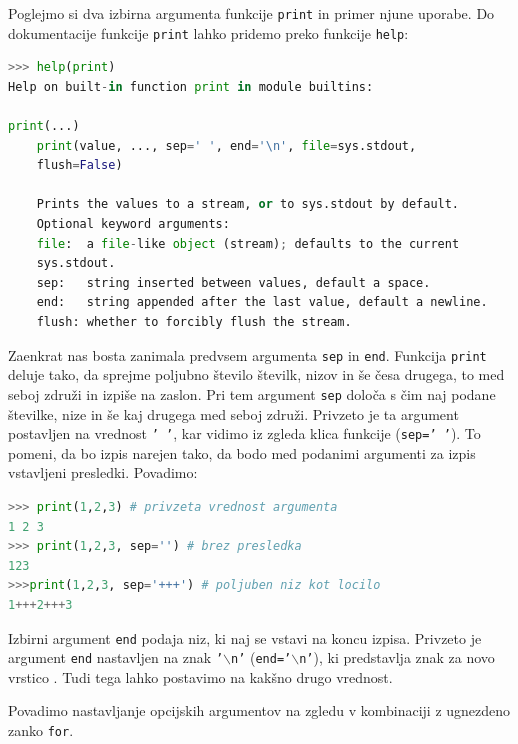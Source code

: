 Poglejmo si dva izbirna argumenta funkcije \texttt{print} in primer njune uporabe. Do dokumentacije funkcije \texttt{print} lahko pridemo preko funkcije \texttt{help}:
\begin{lstlisting}[language=Python, showstringspaces=false]
>>> help(print)
Help on built-in function print in module builtins:

print(...)
    print(value, ..., sep=' ', end='\n', file=sys.stdout, 
    flush=False)
    
    Prints the values to a stream, or to sys.stdout by default.
    Optional keyword arguments:
    file:  a file-like object (stream); defaults to the current 
    sys.stdout.
    sep:   string inserted between values, default a space.
    end:   string appended after the last value, default a newline.
    flush: whether to forcibly flush the stream.
\end{lstlisting}
Zaenkrat nas bosta zanimala predvsem argumenta \texttt{sep} in \texttt{end}. Funkcija \texttt{print} deluje tako, da sprejme poljubno število številk, nizov in še česa drugega, to med seboj združi in izpiše na zaslon. Pri tem argument \texttt{sep} določa s čim naj podane številke, nize in še kaj drugega med seboj združi. Privzeto je ta argument postavljen na vrednost \texttt{' '}, kar vidimo iz zgleda klica funkcije (\texttt{sep=' '}). To pomeni, da bo izpis narejen tako, da bodo med podanimi argumenti za izpis vstavljeni presledki. Povadimo:
\begin{lstlisting}[language=Python, showstringspaces=false]
>>> print(1,2,3) # privzeta vrednost argumenta
1 2 3
>>> print(1,2,3, sep='') # brez presledka
123
>>>print(1,2,3, sep='+++') # poljuben niz kot locilo
1+++2+++3
\end{lstlisting}
Izbirni argument \texttt{end} podaja niz, ki naj se vstavi na koncu izpisa. Privzeto je argument \texttt{end} nastavljen na znak \texttt{'$\backslash$n'} (\texttt{end='$\backslash$n'}), ki predstavlja znak za novo vrstico . Tudi tega lahko postavimo na kakšno drugo vrednost. 

Povadimo nastavljanje opcijskih argumentov na zgledu v kombinaciji z ugnezdeno zanko \texttt{for}.

